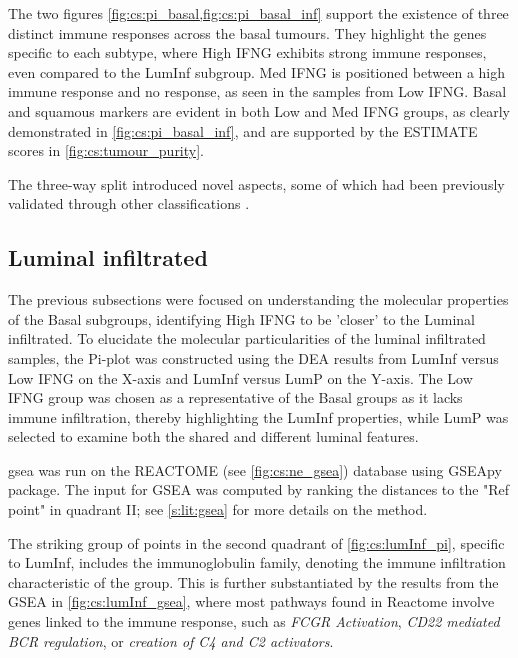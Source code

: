 The two figures \cref{fig:cs:pi_basal,fig:cs:pi_basal_inf} support the existence of three distinct immune responses across the basal tumours. They highlight the genes specific to each subtype, where High IFNG exhibits strong immune responses, even compared to the LumInf subgroup. Med IFNG is positioned between a high immune response and no response, as seen in the samples from Low IFNG. Basal and squamous markers are evident in both Low and Med IFNG groups, as clearly demonstrated in \cref{fig:cs:pi_basal_inf}, and are supported by the ESTIMATE scores in \cref{fig:cs:tumour_purity}.

The three-way split introduced novel aspects, some of which had been previously validated through other classifications \citet{Baker2022-bj,Marzouka2018-ge}. 

\subsection{Luminal infiltrated} \label{s:cs:lumInf_interp}

The previous subsections were focused on understanding the molecular properties of the Basal subgroups, identifying High IFNG to be 'closer' to the Luminal infiltrated. To elucidate the molecular particularities of the luminal infiltrated samples, the Pi-plot was constructed using the DEA results from LumInf versus Low IFNG on the X-axis and LumInf versus LumP on the Y-axis. The Low IFNG group was chosen as a representative of the Basal groups as it lacks immune infiltration, thereby highlighting the LumInf properties, while LumP was selected to examine both the shared and different luminal features.

\acrfull{gsea} was run on the REACTOME (see \cref{fig:cs:ne_gsea}) database using GSEApy \citet{Fang2023-ec} package. The input for GSEA was computed by ranking the distances to the "Ref point" in quadrant II; see \cref{s:lit:gsea} for more details on the method.

The striking group of points in the second quadrant of \cref{fig:cs:lumInf_pi}, specific to LumInf, includes the immunoglobulin family, denoting the immune infiltration characteristic of the group. This is further substantiated by the results from the GSEA in \cref{fig:cs:lumInf_gsea}, where most pathways found in Reactome involve genes linked to the immune response, such as \textit{FCGR Activation}, \textit{CD22 mediated BCR regulation}, or \textit{creation of C4 and C2 activators}.


